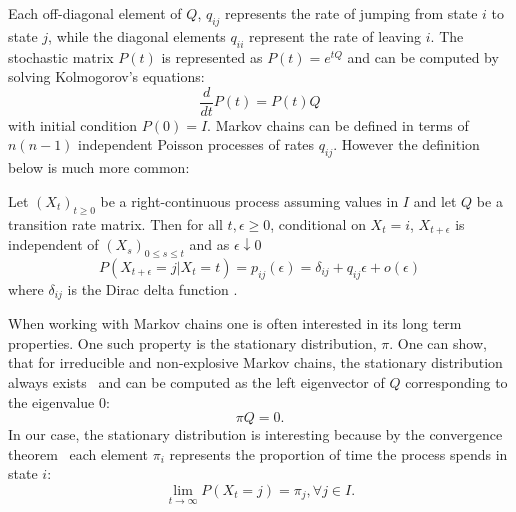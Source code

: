 Each off-diagonal element of $Q$, $q_{ij}$ represents the rate of jumping from state $i$ to state $j$,
while the diagonal elements $q_{ii}$ represent the rate of leaving $i$. The stochastic matrix
$P(t)$ is represented as $P(t) = e^{tQ}$ and can be computed by solving Kolmogorov's equations:
\begin{equation}
	\nonumber
	\frac{d}{dt}P(t) = P(t)Q
\end{equation}
with initial condition $P(0) = I$.
%
Markov chains can be defined in terms of $n(n-1)$ independent Poisson processes
of rates $q_{ij}$. However the definition below is much more common:%
\begin{defn}
	\label{def:ctmc}
	Let $(X_t)_{t \ge 0}$ be a right-continuous process assuming values in $I$ and let $Q$
	be a transition rate matrix. Then for all $t, \epsilon \ge 0$, conditional on $X_t = i$,
	$X_{t+\epsilon}$ is independent of $(X_s)_{0 \le s \le t}$ and as $\epsilon \downarrow 0$
	\begin{equation}
		\nonumber
		P(X_{t+\epsilon} = j | X_t = t) = p_{ij}(\epsilon) = \delta_{ij} + q_{ij}\epsilon + o(\epsilon)
	\end{equation}
	where $\delta_{ij}$ is the Dirac delta function \cite{norris1998markov}.
\end{defn}
When working with Markov
chains one is often interested in its long term properties. One such property is the
stationary distribution, $\pi$. One can show, that for irreducible and non-explosive Markov chains,
the stationary distribution always exists~\cite{norris1998markov} and can be computed as the left eigenvector of $Q$ 
corresponding to the eigenvalue $0$:
\begin{equation}
	\nonumber
	\pi Q = 0.
\end{equation}
In our case, the stationary distribution is interesting because by the convergence theorem~\cite{aldous-fill-2014}
each element $\pi_i$ represents the proportion of time the process spends in state $i$:
\begin{equation}
	\nonumber
	\lim\limits_{t \rightarrow \infty} P(X_t = j) = \pi_j, \forall j \in I.
\end{equation}

